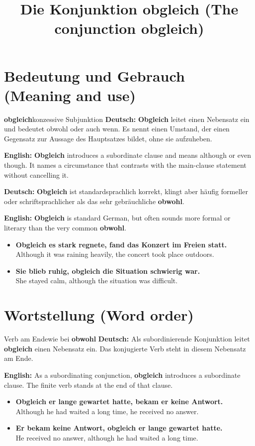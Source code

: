 \documentclass[a4paper,11pt]{article}
\title{Die Konjunktion \glqq obgleich\grqq{} \textnormal{(The conjunction \glqq obgleich\grqq)}}\date{}
\newcommand{\GermanText}[1]{\textbf{Deutsch: }#1\par}\newcommand{\EnglishText}[1]{{\small\color{SoftGray}\textbf{English: }#1\par}}\newcommand{\ExampleItem}[2]{\item \textbf{#1}\\{\small\color{SoftGray}#2}}
\begin{document}
\maketitle\tableofcontents\newpage
\section{Bedeutung und Gebrauch \textnormal{(Meaning and use)}}
\begin{grammarentry}{\textbf{obgleich}}{konzessive Subjunktion}
\GermanText{\textbf{Obgleich} leitet einen Nebensatz ein und bedeutet \glqq obwohl\grqq{} oder \glqq auch wenn\grqq. Es nennt einen Umstand, der einen Gegensatz zur Aussage des Hauptsatzes bildet, ohne sie aufzuheben.}
\EnglishText{\textbf{Obgleich} introduces a subordinate clause and means \glqq although\grqq{} or \glqq even though\grqq. It names a circumstance that contrasts with the main-clause statement without cancelling it.}
\GermanText{\textbf{Obgleich} ist standardsprachlich korrekt, klingt aber häufig formeller oder schriftsprachlicher als das sehr gebräuchliche \textbf{obwohl}.}
\EnglishText{\textbf{Obgleich} is standard German, but often sounds more formal or literary than the very common \textbf{obwohl}.}
\end{grammarentry}
\begin{exbox}\begin{itemize}
\ExampleItem{Obgleich es stark regnete, fand das Konzert im Freien statt.}{Although it was raining heavily, the concert took place outdoors.}
\ExampleItem{Sie blieb ruhig, obgleich die Situation schwierig war.}{She stayed calm, although the situation was difficult.}
\end{itemize}\end{exbox}

\section{Wortstellung \textnormal{(Word order)}}
\begin{grammarentry}{Verb am Ende}{wie bei \textbf{obwohl}}
\GermanText{Als subordinierende Konjunktion leitet \textbf{obgleich} einen Nebensatz ein. Das konjugierte Verb steht in diesem Nebensatz am Ende.}
\EnglishText{As a subordinating conjunction, \textbf{obgleich} introduces a subordinate clause. The finite verb stands at the end of that clause.}
\end{grammarentry}
\begin{exbox}\begin{itemize}
\ExampleItem{Obgleich er lange gewartet hatte, bekam er keine Antwort.}{Although he had waited a long time, he received no answer.}
\ExampleItem{Er bekam keine Antwort, obgleich er lange gewartet hatte.}{He received no answer, although he had waited a long time.}
\end{itemize}\end{exbox}
\end{document}
